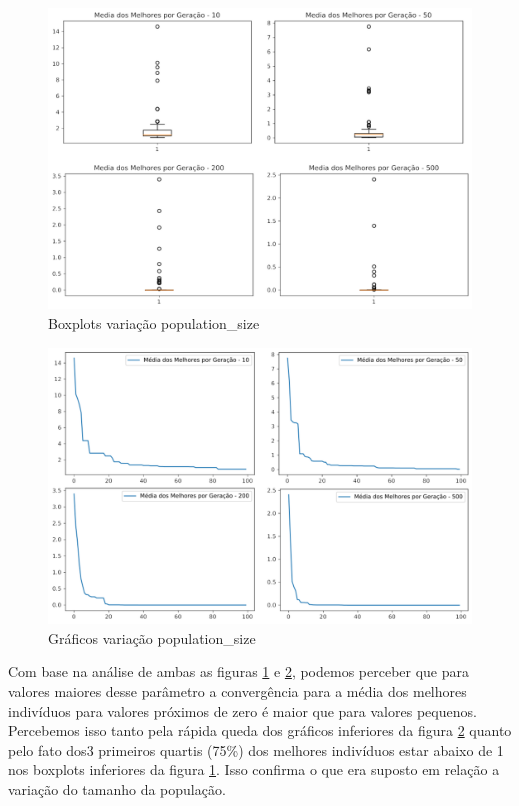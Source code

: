 \documentclass[12pt]{article}
\begin{document}
\begin{figure}[H]
	\centering
	\includegraphics[width=0.9\linewidth]{Imagens/populationSize/boxplotPopSize}
	\caption{Boxplots variação population\_size}
	\label{fig:boxplotpopsize}
\end{figure}
\begin{figure}[H]
	\centering
	\includegraphics[width=0.9\linewidth]{Imagens/populationSize/graficoPopSize}
	\caption{Gráficos variação population\_size}
	\label{fig:graficopopsize}
\end{figure}

Com base na análise de ambas as figuras \ref{fig:boxplotpopsize} e \ref{fig:graficopopsize}, podemos perceber que para valores maiores desse parâmetro a convergência para a média dos melhores indivíduos para valores próximos de zero é maior que para valores pequenos. Percebemos isso tanto pela rápida queda dos gráficos inferiores da figura \ref{fig:graficopopsize} quanto pelo fato dos3 primeiros quartis (75\%) dos melhores indivíduos estar abaixo de 1 nos boxplots inferiores da figura \ref{fig:boxplotpopsize}. Isso confirma o que era suposto em relação a variação do tamanho da população.
\end{document}
